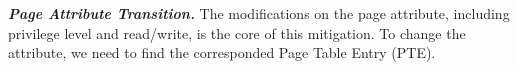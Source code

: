 


\textbf{\textit{Page Attribute Transition.}} The modifications on the page attribute, including privilege level and read/write, is the core of this mitigation. To change the attribute, we need to find the corresponded Page Table Entry (PTE).  


%
%
%


